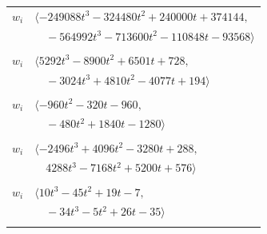 \documentclass[11pt]{article}
\begin{document}
\begin{longtable}{@{}ll@{}}
$w_i$ & $\langle -249088t^{3}-324480t^{2}+240000t+374144,$\\
 & $\quad -564992t^{3}-713600t^{2}-110848t-93568\rangle$\\
\addlinespace[2pt]
\multicolumn{2}{@{}p{0.97\textwidth}@{}}{$i=47$, $D_i=1$, $\rho_{ij}$: $2{:}2, \allowbreak 3{:}1, \allowbreak 5{:}2, \allowbreak 6{:}1, \allowbreak 8{:}3, \allowbreak 9{:}2, \allowbreak 11{:}1, \allowbreak 13{:}2, \allowbreak 27{:}3, \allowbreak 30{:}1, \allowbreak 32{:}3, \allowbreak 34{:}2, \allowbreak 44{:}2, \allowbreak 53{:}3$}\\
$w_i$ & $\langle 5292t^{3}-8900t^{2}+6501t+728,$\\
 & $\quad -3024t^{3}+4810t^{2}-4077t+194\rangle$\\
\addlinespace[2pt]
\multicolumn{2}{@{}p{0.97\textwidth}@{}}{$i=48$, $D_i=2$, $e_i=0$, $\rho_{ij}$: $3{:}1, \allowbreak 6{:}3, \allowbreak 7{:}1, \allowbreak 12{:}1, \allowbreak 13{:}2, \allowbreak 16{:}1, \allowbreak 19{:}2, \allowbreak 28{:}1, \allowbreak 30{:}3, \allowbreak 37{:}3, \allowbreak 50{:}3, \allowbreak 51{:}1$}\\
$w_i$ & $\langle -960t^{2}-320t-960,$\\
 & $\quad -480t^{2}+1840t-1280\rangle$\\
\addlinespace[2pt]
\multicolumn{2}{@{}p{0.97\textwidth}@{}}{$i=49$, $D_i=2$, $e_i=1$, $\rho_{ij}$: $2{:}2, \allowbreak 9{:}3, \allowbreak 10{:}1, \allowbreak 11{:}1, \allowbreak 13{:}2, \allowbreak 14{:}2, \allowbreak 25{:}3, \allowbreak 33{:}1, \allowbreak 34{:}2, \allowbreak 35{:}2, \allowbreak 46{:}1$}\\
$w_i$ & $\langle -2496t^{3}+4096t^{2}-3280t+288,$\\
 & $\quad 4288t^{3}-7168t^{2}+5200t+576\rangle$\\
\addlinespace[2pt]
\multicolumn{2}{@{}p{0.97\textwidth}@{}}{$i=50$, $D_i=1$, $\rho_{ij}$: $7{:}3, \allowbreak 11{:}3, \allowbreak 12{:}1, \allowbreak 18{:}1, \allowbreak 20{:}3, \allowbreak 33{:}3, \allowbreak 35{:}2, \allowbreak 42{:}3, \allowbreak 44{:}3, \allowbreak 48{:}1, \allowbreak 53{:}2$}\\
$w_i$ & $\langle 10t^{3}-45t^{2}+19t-7,$\\
 & $\quad -34t^{3}-5t^{2}+26t-35\rangle$\\
\addlinespace[2pt]
\multicolumn{2}{@{}p{0.97\textwidth}@{}}{$i=51$, $D_i=1$, $e_i=0$, $\rho_{ij}$: $3{:}1, \allowbreak 9{:}2, \allowbreak 21{:}2, \allowbreak 30{:}1, \allowbreak 31{:}1, \allowbreak 34{:}1, \allowbreak 48{:}3, \allowbreak 54{:}2$}\\

\end{longtable}
\end{document}
